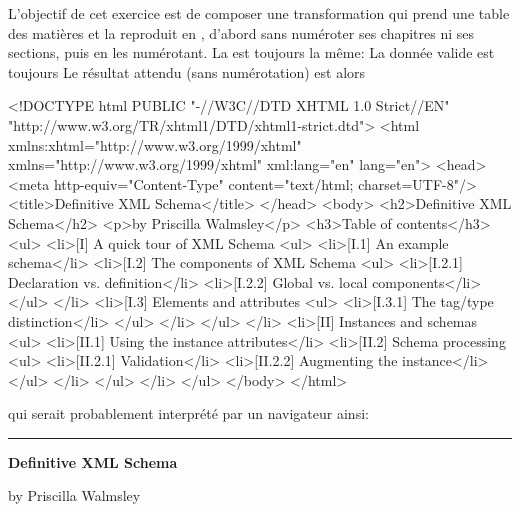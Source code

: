 L'objectif de cet exercice est de composer une transformation \XSLT
qui prend une table des matières et la reproduit en \XHTML, d'abord
sans numéroter ses chapitres ni ses sections, puis en les
numérotant. La \DTD est toujours la même:
\noindent La donnée valide est toujours
\noindent Le résultat attendu (sans numérotation) est alors
\begin{sverb}
<!DOCTYPE html
  PUBLIC "-//W3C//DTD XHTML 1.0 Strict//EN"
  "http://www.w3.org/TR/xhtml1/DTD/xhtml1-strict.dtd">
<html xmlns:xhtml="http://www.w3.org/1999/xhtml"
      xmlns="http://www.w3.org/1999/xhtml"
      xml:lang="en" lang="en">
  <head>
    <meta http-equiv="Content-Type"
          content="text/html; charset=UTF-8"/>
    <title>Definitive XML Schema</title>
  </head>
  <body>
    <h2>Definitive XML Schema</h2>
    <p>by Priscilla Walmsley</p>
    <h3>Table of contents</h3>
    <ul>
      <li>[I] A quick tour of XML Schema
        <ul>
          <li>[I.1] An example schema</li>
          <li>[I.2] The components of XML Schema
            <ul>
              <li>[I.2.1] Declaration vs. definition</li>
              <li>[I.2.2] Global vs. local components</li>
            </ul>
          </li>
          <li>[I.3] Elements and attributes
            <ul>
              <li>[I.3.1] The tag/type distinction</li>
            </ul>
          </li>
        </ul>
      </li>
      <li>[II] Instances and schemas
        <ul>
          <li>[II.1] Using the instance attributes</li>
          <li>[II.2] Schema processing
            <ul>
              <li>[II.2.1] Validation</li>
              <li>[II.2.2] Augmenting the instance</li>
            </ul>
          </li>
        </ul>
      </li>
    </ul>
  </body>
</html>
\end{sverb}
qui serait probablement interprété par un navigateur ainsi:

\noindent\rule{\linewidth}{0.5pt}
\noindent\textbf{\large Definitive XML Schema}

\bigskip

\noindent by Priscilla Walmsley

\bigskip


